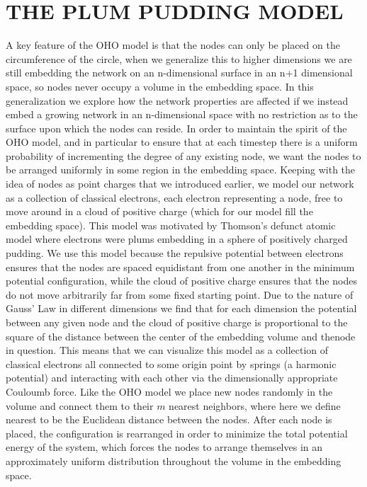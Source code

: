 \documentclass[aps,pre,reprint,superscriptaddress,amsmath,amssymb]{revtex4-1}
\begin{document}
\section{THE PLUM PUDDING MODEL}
A key feature of the OHO model is that the nodes can only be placed on the circumference of the circle, when we generalize this to higher dimensions we are still embedding the network on an n-dimensional surface in an n+1 dimensional space, so nodes never occupy a volume in the embedding space.
In this generalization we explore how the network properties are affected if we instead embed a growing network in an n-dimensional space with no restriction as to the surface upon which the nodes can reside.
In order to maintain the spirit of the OHO model, and in particular to ensure that at each timestep there is a uniform probability of incrementing the degree of any existing node, we want the nodes to be arranged uniformly in some region in the embedding space.
Keeping with the idea of nodes as point charges that we introduced earlier, we model our network as a collection of classical electrons, each electron representing a node, free to move around in a cloud of positive charge (which for our model fill the embedding space).
This model was motivated by Thomson's defunct atomic model where electrons were plums embedding in a sphere of positively charged pudding.
We use this model because the repulsive potential between electrons ensures that the nodes are spaced equidistant from one another in the minimum potential configuration, while the cloud of positive charge ensures that the nodes do not move arbitrarily far from some fixed starting point.
Due to the nature of Gauss' Law in different dimensions we find that for each dimension the potential between any given node and the cloud of positive charge is proportional to the square of the distance between the center of the embedding volume and thenode in question.
This means that we can visualize this model as a collection of classical electrons all connected to some origin point by springs (a harmonic potential) and interacting with each other via the dimensionally appropriate Couloumb force.
Like the OHO model we place new nodes randomly in the volume and connect them to their $m$ nearest neighbors, where here we define nearest to be the Euclidean distance between the nodes.
After each node is placed, the configuration is rearranged in order to minimize the total potential energy of the system, which forces the nodes to arrange themselves in an approximately uniform distribution throughout the volume in the embedding space.
\end{document}
